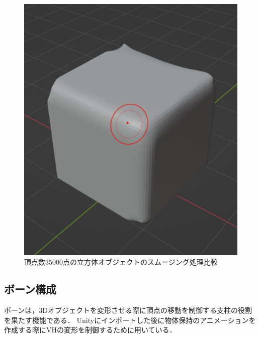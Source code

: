 \documentclass{ltjsreport}
\begin{document}
\begin{figure}[H]
\begin{minipage}{0.3\columnwidth}
			\includegraphics[width = \columnwidth]{../figs/SmoothingAfterCube.png}
			\end{minipage}
			\caption{頂点数35000点の立方体オブジェクトのスムージング処理比較}
			\end{figure}
		\subsection{ボーン構成}
			ボーンは，3Dオブジェクトを変形させる際に頂点の移動を制御する支柱の役割を果たす機能である．
			Unityにインポートした後に物体保持のアニメーションを作成する際にVHの変形を制御するために用いている．
\end{document}
